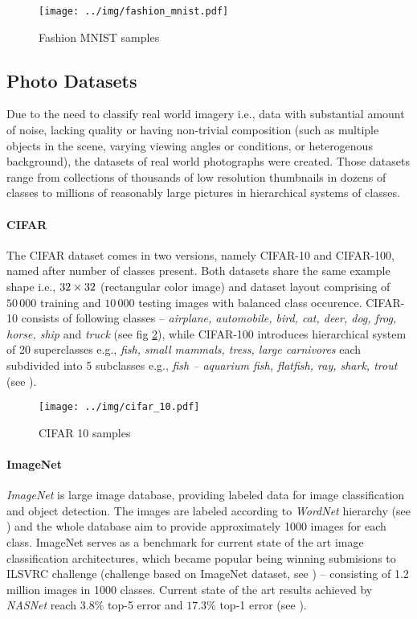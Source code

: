 \begin{figure}
    \centering
    \texttt{[image: ../img/fashion\_mnist.pdf]}
    \caption{Fashion MNIST samples}
    \label{fig:fashion_mnist}
\end{figure}

\subsection{Photo Datasets}
Due to the need to classify real world imagery i.e., data with substantial amount of noise, lacking quality or having non-trivial composition (such as multiple objects in the scene, varying viewing angles or conditions, or heterogenous background), the datasets of real world photographs were created. Those datasets range from collections of thousands of low resolution thumbnails in dozens of classes to millions of reasonably large pictures in hierarchical systems of classes.

\paragraph{CIFAR}

The CIFAR dataset comes in two versions, namely CIFAR-10 and CIFAR-100, named after number of classes present. Both datasets share the same example shape i.e., $32 \times 32 \time 3$ (rectangular color image) and dataset layout comprising of $50\,000$ training and $10\,000$ testing images with balanced class occurence. CIFAR-10 consists of following classes -- \emph{airplane, automobile, bird, cat, deer, dog, frog, horse, ship} and \emph{truck} (see fig \ref{fig:cifar_10}), while CIFAR-100 introduces hierarchical system of 20 superclasses e.g., \emph{fish, small mammals, tress, large carnivores} each subdivided into 5 subclasses e.g., \emph{fish -- aquarium fish, flatfish, ray, shark, trout} (see \cite{Krizhevsky09learningmultiple}).

\begin{figure}
    \centering
    \texttt{[image: ../img/cifar\_10.pdf]}
    \caption{CIFAR 10 samples}
    \label{fig:cifar_10}
\end{figure}

\paragraph{ImageNet}

\emph{ImageNet} is large image database, providing labeled data for image classification and object detection. The images are labeled according to \emph{WordNet\textsuperscript{\textregistered}} hierarchy (see \cite{wordnet}) and the whole database aim to provide approximately 1000 images for each class. ImageNet serves as a benchmark for current state of the art image classification architectures, which became popular being winning submisions to ILSVRC challenge (challenge based on ImageNet dataset, see \cite{ILSVRC15}) -- consisting of 1.2 million images in 1000 classes. Current state of the art results achieved by \emph{NASNet} reach $3.8\%$ top-5 error and $17.3\%$ top-1 error (see \cite{nasnet}).

